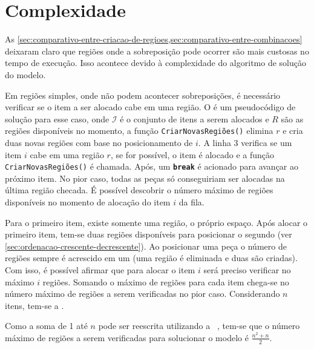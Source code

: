 \section{Complexidade}\label{sec:complexidade}

As \cref{sec:comparativo-entre-criacao-de-regioes,sec:comparativo-entre-combinacoes} deixaram claro
que regiões onde a sobreposição pode ocorrer são mais custosas no tempo de execução.
Isso acontece devido à complexidade do algoritmo de solução do modelo.

Em regiões simples, onde não podem acontecer sobreposições, é necessário verificar se o item a ser
alocado cabe em uma região.
O  é um pseudocódigo de solução para esse caso, onde $\mathcal{I}$ é o
conjunto de itens a serem alocados e $R$ são as regiões disponíveis no momento, a função
\texttt{CriarNovasRegiões()} elimina $r$ e cria duas novas regiões com base no posicionamento de $i$.
A linha 3 verifica se um item $i$ cabe em uma região $r$, se for possível, o item é alocado e a
função \texttt{CriarNovasRegiões()} é chamada.
Após, um \texttt{\textbf{break}} é acionado para avançar ao próximo item.
No pior caso, todas as peças só conseguiriam ser alocadas na última região checada.
É possível descobrir o número máximo de regiões disponíveis no momento de alocação do item $i$ da
fila.



Para o primeiro item, existe somente uma região, o próprio espaço.
Após alocar o primeiro item, tem-se duas regiões disponíveis para posicionar o segundo (ver
\cref{sec:ordenacao-crescente-decrescente}).
Ao posicionar uma peça o número de regiões sempre é acrescido em um (uma região é eliminada e duas
são criadas).
Com isso, é possível afirmar que para alocar o item $i$ será preciso verificar no máximo $i$ regiões.
Somando o máximo de regiões para cada item chega-se no número máximo de regiões a serem verificadas
no pior caso.
Considerando $n$ itens, tem-se a .



Como a soma de 1 até $n$ pode ser reescrita utilizando a 
~\cite{merca2015alternative}, tem-se que o número máximo de regiões a serem verificadas
para solucionar o modelo é $\frac{n^2 + n}{2}$.



